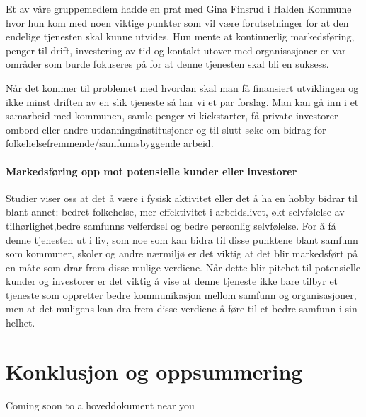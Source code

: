 Et av våre gruppemedlem hadde en prat med Gina Finsrud i Halden Kommune hvor hun kom med noen viktige punkter som vil være forutsetninger for at den endelige tjenesten skal kunne utvides. Hun mente at kontinuerlig markedsføring, penger til drift, investering av tid og kontakt utover med organisasjoner er var områder som burde fokuseres på for at denne tjenesten skal bli en suksess.\cite{KOMMUNEN-INTERVJU:20} 

Når det kommer til problemet med hvordan skal man få finansiert utviklingen og ikke minst driften av en slik tjeneste så har vi et par forslag. Man kan gå inn i et samarbeid med kommunen, samle penger vi kickstarter, få private investorer ombord eller andre utdanningsinstitusjoner og til slutt søke om bidrag for folkehelsefremmende/samfunnsbyggende arbeid.




\paragraph{Markedsføring opp mot potensielle kunder eller investorer}


Studier viser oss at det å være i fysisk aktivitet eller det å ha en hobby bidrar til blant annet: bedret folkehelse, mer effektivitet i arbeidslivet, økt selvfølelse av tilhørlighet,bedre samfunns velferdsel og bedre personlig selvfølelse. For å få denne tjenesten ut i liv, som noe som kan bidra til disse punktene blant samfunn som kommuner, skoler og andre nærmiljø er det viktig at det blir markedsført på en måte som drar frem disse mulige verdiene. Når dette blir pitchet til potensielle kunder og investorer er det viktig å vise at denne tjeneste ikke bare tilbyr et tjeneste som oppretter bedre kommunikasjon mellom samfunn og organisasjoner, men at det muligens kan dra frem disse verdiene å føre til et bedre samfunn i sin helhet.


\section{Konklusjon og oppsummering}
Coming soon to a hoveddokument near you










